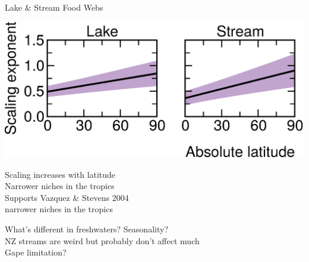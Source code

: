 \documentclass{beamer}
\begin{document}
  \begin{frame}{Lake \& Stream Food Webs}
    \begin{center}
      \includegraphics*[width=.9\textwidth]{Figures/results/effect_mod.eps}

      \vspace{1cm}
      Scaling increases with latitude\\
      Narrower niches in the tropics\\
      \vspace{.54cm}
      Supports Vazquez \& Stevens 2004\\
      {\color{white} narrower niches in the tropics}

    \end{center}
  \end{frame}


  \begin{frame}{What's different in freshwaters?}
    Seasonality?\\
    NZ streams are weird but probably don't affect much\\
    Gape limitation?\\
  \end{frame}
\end{document}
